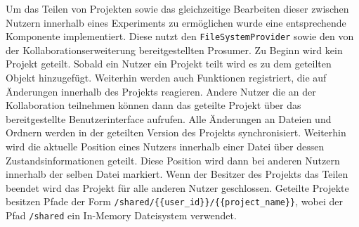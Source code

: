 Um das Teilen von Projekten sowie das gleichzeitige Bearbeiten dieser zwischen Nutzern innerhalb eines Experiments zu ermöglichen wurde eine entsprechende Komponente implementiert. Diese nutzt den \texttt{FileSystemProvider} sowie den von der Kollaborationserweiterung bereitgestellten Prosumer. Zu Beginn wird kein Projekt geteilt. Sobald ein Nutzer ein Projekt teilt wird es zu dem geteilten Objekt hinzugefügt. Weiterhin werden auch Funktionen registriert, die auf Änderungen innerhalb des Projekts reagieren. Andere Nutzer die an der Kollaboration teilnehmen können dann das geteilte Projekt über das bereitgestellte Benutzerinterface aufrufen. Alle Änderungen an Dateien und Ordnern werden in der geteilten Version des Projekts synchronisiert. Weiterhin wird die aktuelle Position eines Nutzers innerhalb einer Datei über dessen Zustandsinformationen geteilt. Diese Position wird dann bei anderen Nutzern innerhalb der selben Datei markiert. Wenn der Besitzer des Projekts das Teilen beendet wird das Projekt für alle anderen Nutzer geschlossen. Geteilte Projekte besitzen Pfade der Form \texttt{/shared/\{\{user\_id\}\}/\{\{project\_name\}\}}, wobei der Pfad \texttt{/shared} ein In-Memory Dateisystem verwendet.